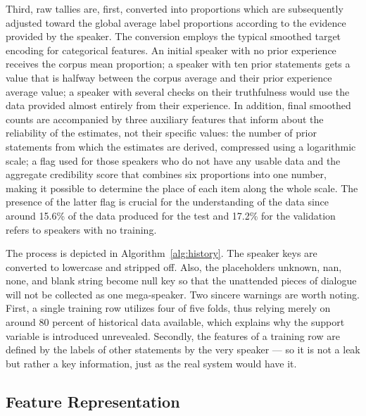 Third, raw tallies are, first, converted into proportions which are subsequently adjusted toward the global average label proportions according to the evidence provided by the speaker. The conversion employs the typical smoothed target encoding for categorical features. An initial speaker with no prior experience receives the corpus mean proportion; a speaker with ten prior statements gets a value that is halfway between the corpus average and their prior experience average value; a speaker with several checks on their truthfulness would use the data provided almost entirely from their experience. In addition, final smoothed counts are accompanied by three auxiliary features that inform about the reliability of the estimates, not their specific values: the number of prior statements from which the estimates are derived, compressed using a logarithmic scale; a flag used for those speakers who do not have any usable data and the aggregate credibility score that combines six proportions into one number, making it possible to determine the place of each item along the whole scale. The presence of the latter flag is crucial for the understanding of the data since around 15.6\% of the data produced for the test and 17.2\% for the validation refers to speakers with no training.

The process is depicted in Algorithm~\ref{alg:history}. The speaker keys are converted to lowercase and stripped off. Also, the placeholders unknown, nan, none, and blank string become null key so that the unattended pieces of dialogue will not be collected as one mega-speaker. Two sincere warnings are worth noting. First, a single training row utilizes four of five folds, thus relying merely on around 80 percent of historical data available, which explains why the support variable is introduced unrevealed. Secondly, the features of a training row are defined by the labels of other statements by the very speaker --- so it is not a leak but rather a key information, just as the real system would have it.



\subsection{Feature Representation}

